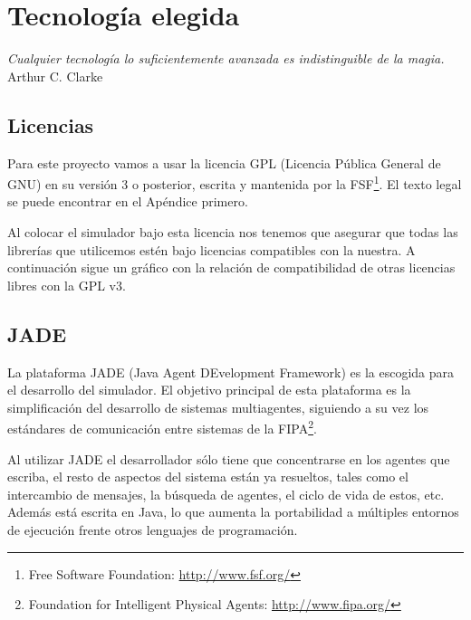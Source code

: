 
\chapter*{Tecnología elegida} \label{cap4}


\begin{flushright}
\begin{minipage}{7.85cm}
    {\em Cualquier tecnología lo suficientemente avanzada es indistinguible de
    la magia.} \\ Arthur C. Clarke
\end{minipage}
\end{flushright}

\vspace*{5mm}

\section*{Licencias}

Para este proyecto vamos a usar la licencia GPL (Licencia Pública General de
GNU) en su versión 3 o posterior, escrita y mantenida por la FSF\footnote{Free
Software Foundation: \url{http://www.fsf.org/}}. El texto legal se puede
encontrar en el Apéndice primero. %

Al colocar el simulador bajo esta licencia nos tenemos que asegurar que todas
las librerías que utilicemos estén bajo licencias compatibles con la nuestra. A
continuación sigue un gráfico con la relación de compatibilidad de otras
licencias libres con la GPL v3.


\section*{JADE}

La plataforma JADE (Java Agent DEvelopment Framework) es la escogida para el
desarrollo del simulador. El objetivo principal de esta plataforma es la
simplificación del desarrollo de sistemas multiagentes, siguiendo a su vez los
estándares de comunicación entre sistemas de la FIPA\footnote{Foundation for
Intelligent Physical Agents: \url{http://www.fipa.org/}}.


Al utilizar JADE el desarrollador sólo tiene que concentrarse en los agentes
que escriba, el resto de aspectos del sistema están ya resueltos, tales como el
intercambio de mensajes, la búsqueda de agentes, el ciclo de vida de estos,
etc. Además está escrita en Java, lo que aumenta la portabilidad a múltiples
entornos de ejecución frente otros lenguajes de programación.

